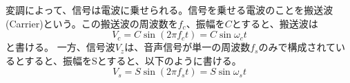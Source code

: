 変調によって、信号は電波に乗せられる。信号を乗せる電波のことを搬送波(Carrier)という。この搬送波の周波数を$f_c$、振幅を$C$とすると、搬送波は
\begin{equation}
V_c = C\sin(2 \pi f_c t) = C\sin\omega_c t
\end{equation}
と書ける。
一方、信号波$V_z$は、音声信号が単一の周波数$f_s$のみで構成されているとすると、振幅をSとすると、以下のように書ける。
\begin{equation}
V_s = S\sin(2 \pi f_s t) = S\sin\omega_s t \label{eq:AM_sig}
\end{equation}
\begin{figure}

\end{figure}
